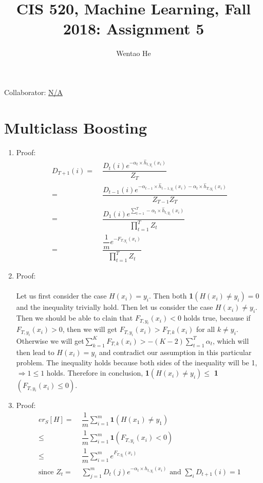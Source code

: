 \documentclass[english]{article}
\title{CIS 520, Machine Learning, Fall 2018: Assignment 5\\}
\date{}
\author{Wentao He}
\begin{document}
\maketitle
{\normalsize Collaborator: \underline{N/A}}


\section{Multiclass Boosting}
\begin{enumerate}
    \item Proof:
    \begin{align*}
    D_{T+1}(i) = &\; \dfrac{D_t(i)e^{-\alpha_t \times \hat{h}_{t, y_i}(x_i)}}{Z_T}\\
    = &\; \dfrac{D_{t-1}(i)e^{-\alpha_{t-1}\times \hat{h}_{t-1, y_i}(x_i)-\alpha_t\times \hat{h}_{T, y_i}(x_i)}}{Z_{T-1}Z_T}\\
    = &\; \dfrac{D_1(i)e^{\sum_{t=1}^{T} -\alpha_t \times \hat{h}_{t, y_i}(x_i)}}{\prod_{t=1}^{T}Z_t}\\
    = &\; \dfrac{\dfrac{1}{m}e^{-F_{T, y_i}(x_i)}}{\prod_{t=1}^{T}Z_t}
    \end{align*}
    \clearpage
    \item Proof:\\\\
    Let us first consider the case $H(x_i) = y_i$. Then both \textbf{1}$(H(x_i) \neq y_i) = 0$ and the inequality trivially hold. Then let us consider the case $H(x_i) \neq y_i$. Then we should be able to clain that $F_{T, y_i}(x_i)<0$ holds true, because if $F_{T, y_i}(x_i)>0$, then we will get $F_{T, y_i}(x_i) > F_{T,k}(x_i)$ for all $k \neq y_i$. Otherwise we will get$ \sum_{k=1}^{K} F_{T,k}(x_i) > -(K-2)\sum_{t=1}^{T} \alpha_t$, which will then lead to $H(x_i) = y_i$ and contradict our assumption in this particular problem. The inequality holds because both sides of the inequality will be 1, $\Rightarrow 1\leq 1$ holds. Therefore in conclusion, \textbf{1}$(H(x_i) \neq y_i) \leq$\textbf{ 1}$(F_{T, y_i}(x_i)\leq 0)$.
    \clearpage
    \item Proof:
    \begin{align*}
    er_S [H] = &\; \dfrac{1}{m}\sum_{i=1}^{m}\mathbf{1}(H(x_1)\neq y_1)\\
    \leq &\; \dfrac{1}{m}\sum_{i=1}^{m}\mathbf{1}(F_{T, y_i}(x_i)<0)\\
    \leq &\; \dfrac{1}{m}\sum_{i=1}^{m} e^{F_{T, y_i}(x_i)}\\
    \text{since } Z_t = &\; \sum_{j=1}^{m}D_t(j)e^{-\alpha_t\times h_{t, y_i}(x_i)} \text{ and } \sum_{i}D_{t+1}(i) = 1\\

\end{align*}
\end{enumerate}
\end{document}
